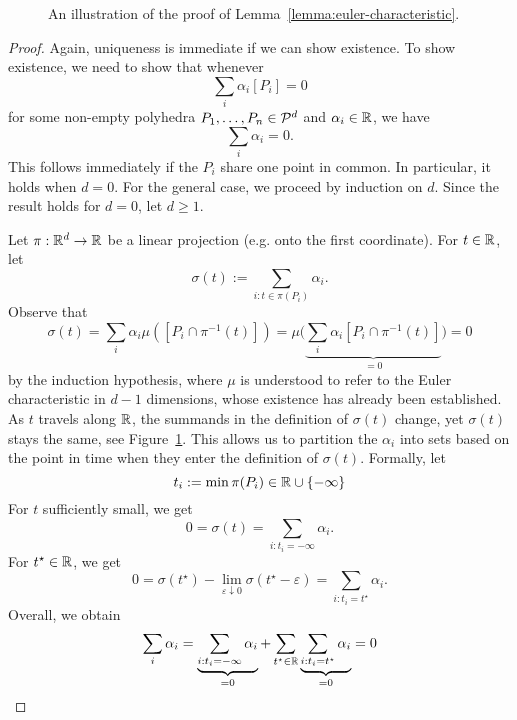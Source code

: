 \begin{figure}
  \begin{center}
  \end{center}
  \caption{An illustration of the proof of Lemma~\ref{lemma:euler-characteristic}.}
  \label{fig:proof-euler-characteristic}
\end{figure}
\begin{proof}
  Again, uniqueness is immediate if we can show existence.
  To show existence, we need to show that whenever
  \[
    \sum_i \alpha_i [P_i] = 0
  \]
  for some non-empty polyhedra $P_1, \ldots, P_n \in \mathcal{P}^d$ and $\alpha_i \in \mathbb{R}$,
  we have
  \[
    \sum_i \alpha_i = 0.
  \]
  This follows immediately if the $P_i$ share one point in common.
  In particular, it holds when $d = 0$.
  For the general case, we proceed by induction on $d$.
  Since the result holds for $d = 0$, let $d \geq 1$.

  Let $\pi : \mathbb{R}^d \to \mathbb{R}$ be a linear projection (e.g. onto the first coordinate).
  For $t \in \mathbb{R}$, let
  \[
    \sigma(t) := \sum_{i : t \in \pi(P_i)} \alpha_i.
  \]
  Observe that
  \[
    \sigma(t) = \sum_i \alpha_i \mu([P_i \cap \pi^{-1}(t)])
      = \mu\big( \underbrace{\sum_i \alpha_i [P_i \cap \pi^{-1}(t)]}_{=0} \big)
      = 0
  \]
  by the induction hypothesis,
  where $\mu$ is understood to refer to the Euler characteristic in $d-1$ dimensions,
  whose existence has already been established.
  As $t$ travels along $\mathbb{R}$,
  the summands in the definition of $\sigma(t)$ change,
  yet $\sigma(t)$ stays the same, see Figure~\ref{fig:proof-euler-characteristic}.
  This allows us to partition the $\alpha_i$ into sets based on the point in time when they enter the definition of $\sigma(t)$.
  Formally, let
  \[
     t_i := \min\pi(P_i) \in \mathbb{R} \cup \{ -\infty \}
  \]
  For $t$ sufficiently small,
  we get
  \[
    0 = \sigma(t) = \sum_{i : t_i = -\infty} \alpha_i.
  \]
  For $t^\star \in \mathbb{R}$, we get
  \[
    0 = \sigma(t^\star) - \lim_{\varepsilon \downarrow 0} \sigma(t^\star - \varepsilon) = \sum_{i: t_i = t^\star} \alpha_i.
  \]
  Overall, we obtain
  \[
    \sum_i \alpha_i = \underbrace{\sum_{i : t_i = -\infty} \alpha_i}_{=0} + \sum_{t^\star \in \mathbb{R}} \underbrace{\sum_{i: t_i = t^\star} \alpha_i}_{=0} = 0 \qedhere
  \]
\end{proof}



